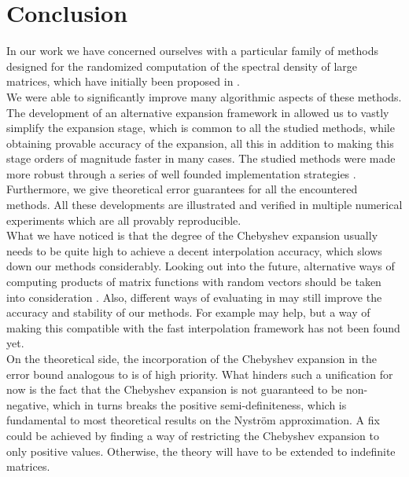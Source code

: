 \chapter{Conclusion}
\label{chp:6-conclusion}

In our work we have concerned ourselves with a particular family of methods
designed for the randomized computation of the spectral density of large matrices,
which have initially been proposed in \cite{lin2017randomized}.\\

We were able to
significantly improve many algorithmic aspects of these methods. The development
of an alternative expansion framework in 
allowed us to vastly simplify the expansion stage, which is common to all the
studied methods, while obtaining provable accuracy of the expansion, all this in
addition to making this stage orders of magnitude faster in many cases. 
The studied methods were made more robust through a series of well founded
implementation strategies .
Furthermore, we give theoretical error guarantees for all the encountered methods.
All these developments are illustrated and verified in multiple numerical experiments
which are all provably reproducible.\\

What we have noticed is that the degree of the Chebyshev expansion usually needs
to be quite high to achieve a decent interpolation accuracy, which slows down
our methods considerably. Looking out into the future, alternative ways of
computing products of matrix functions with random vectors should be taken into
consideration \cite{cortinovis2023speeding,ubaru2017lanczos}. Also, different ways
of evaluating  in 
may still improve the accuracy and stability of our methods. For example
\cite[algorithm~5.6]{tropp2023randomized} may help, but a way of making this
compatible with the fast interpolation framework has not been found yet.\\

On the theoretical side, the incorporation of the Chebyshev expansion in the
error bound analogous to  is of high priority.
What hinders such a unification for now is the fact that the Chebyshev expansion
is not guaranteed to be non-negative, which in turns breaks the positive semi-definiteness,
which is fundamental to most theoretical results on the Nystr\"om approximation.
A fix could be achieved by finding a way of restricting the Chebyshev expansion
to only positive values. Otherwise, the theory will have to be extended to
indefinite matrices.
